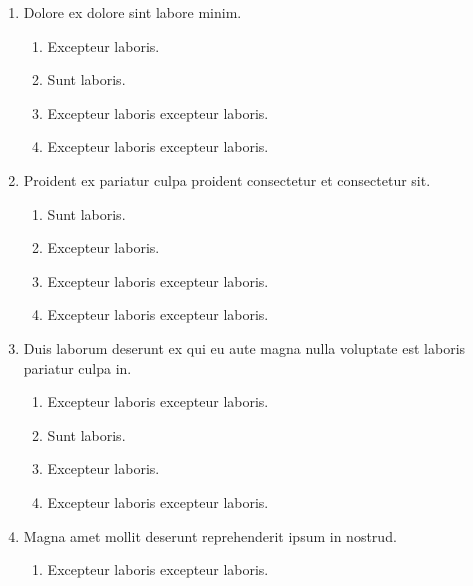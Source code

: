 \documentclass[a4paper,12pt]{article}
\begin{document}
\begin{enumerate}[label=\textbf{\arabic*.}]
\begin{multicols}{2}
\end{multicols}
\item Dolore ex dolore sint labore minim.
\begin{multicols}{2}
	\begin{enumerate}
		\item  Excepteur laboris.
    
		\item  Sunt laboris.
    
		\item  Excepteur laboris excepteur laboris.
  
		\item  Excepteur laboris excepteur laboris.
    
	\end{enumerate}

\end{multicols}
\item Proident ex pariatur culpa proident consectetur et consectetur sit.
\begin{multicols}{2}
	\begin{enumerate}
		\item  Sunt laboris.
    
		\item  Excepteur laboris.
    
		\item  Excepteur laboris excepteur laboris.
  
		\item  Excepteur laboris excepteur laboris.
    
	\end{enumerate}

\end{multicols}
\item Duis laborum deserunt ex qui eu aute magna nulla voluptate est laboris pariatur culpa in.
\begin{multicols}{2}
	\begin{enumerate}
		\item  Excepteur laboris excepteur laboris.
    
		\item  Sunt laboris.
    
		\item  Excepteur laboris.
    
		\item  Excepteur laboris excepteur laboris.
  
	\end{enumerate}

\end{multicols}
\item Magna amet mollit deserunt reprehenderit ipsum in nostrud.
\begin{multicols}{2}
	\begin{enumerate}
		\item  Excepteur laboris excepteur laboris.
  

\end{enumerate}
\end{multicols}
\end{enumerate}
\end{document}
